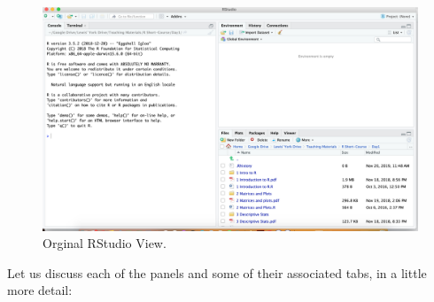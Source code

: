 \documentclass[
]{book}
\theoremstyle{definition}
\theoremstyle{definition}
\theoremstyle{definition}
\theoremstyle{definition}
\theoremstyle{remark}
\begin{document}
\begin{figure}

{\centering \includegraphics[width=0.7\linewidth]{Figures/RStudioBasic} 

}

\caption{Orginal RStudio View.}\label{fig:RStudioBasic}
\end{figure}

Let us discuss each of the panels and some of their associated tabs, in a little more detail:
\end{document}
